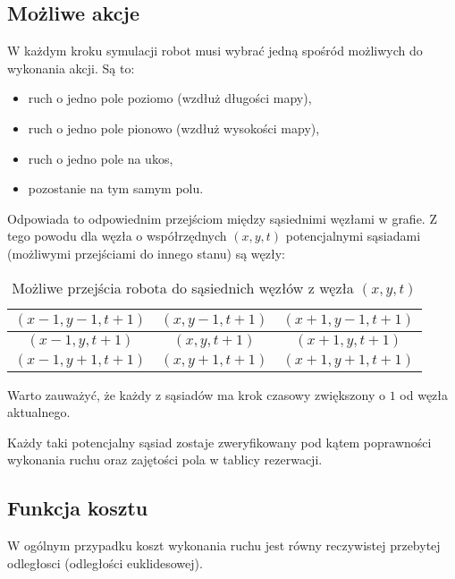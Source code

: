 \subsection{Możliwe akcje}
W każdym kroku symulacji robot musi wybrać jedną spośród możliwych do wykonania akcji. Są to:
\begin{itemize}
	\item ruch o jedno pole poziomo (wzdłuż długości mapy),
	\item ruch o jedno pole pionowo (wzdłuż wysokości mapy),
	\item ruch o jedno pole na ukos,
	\item pozostanie na tym samym polu.
\end{itemize}
Odpowiada to odpowiednim przejściom między sąsiednimi węzłami w grafie.
Z tego powodu dla węzła o współrzędnych $(x, y, t)$ potencjalnymi sąsiadami (możliwymi przejściami do innego stanu) są węzły:

\begin{table}[H]
\caption{Możliwe przejścia robota do sąsiednich węzłów z węzła $(x, y, t)$} \label{tab:node-neighbours} 
\centering
\begin{tabular}{| c | c | c |}
\hline
$(x-1, y-1, t+1)$ & $(x, y-1, t+1)$ & $(x+1, y-1, t+1)$ \\ \hline
$(x-1, y, t+1)$   & $(x, y, t+1)$   & $(x+1, y, t+1)$   \\ \hline
$(x-1, y+1, t+1)$ & $(x, y+1, t+1)$ & $(x+1, y+1, t+1)$ \\ \hline
\end{tabular}
\end{table}
Warto zauważyć, że każdy z sąsiadów ma krok czasowy zwiększony o $1$ od węzła aktualnego.

Każdy taki potencjalny sąsiad zostaje zweryfikowany pod kątem poprawności wykonania ruchu oraz zajętości pola w tablicy rezerwacji.

\subsection{Funkcja kosztu}
W ogólnym przypadku koszt wykonania ruchu jest równy reczywistej przebytej odległosci (odległości euklidesowej).

